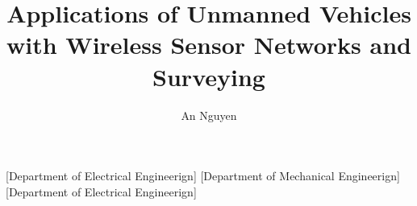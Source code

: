 \documentclass[12pt]{report}
\begin{document}
\chapternumberfont{\fontsize{16}{20}\selectfont}
\chaptertitlefont{\centering\fontsize{16}{20}\selectfont}
\sectionfont{\fontsize{14}{16}\selectfont}
\subsectionfont{\fontsize{12}{14}\selectfont}

\title{Applications of Unmanned Vehicles with Wireless Sensor Networks and Surveying} %
\author{An Nguyen}


[Department of Electrical Engineerign]
[Department of Mechanical Engineerign]
[Department of Electrical Engineerign]

\copyrighttrue
{}

\dissertationfalse

%
\makecoverpages

%
\begin{acknowledgements}

\end{acknowledgements}
\end{document}
